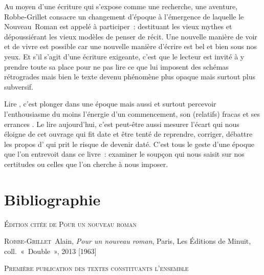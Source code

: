 \documentclass[12pt, a4paper]{article}
\begin{document}
Au moyen d'une écriture qui s'expose comme une recherche, une aventure, Robbe-Grillet consacre un changement d'époque à l'émergence de laquelle le Nouveau~Roman est appelé à participer~: destituant les vieux mythes et dépoussiérant les vieux modèles de penser de récit. Une nouvelle manière de voir et de vivre est possible car une nouvelle manière d'écrire est bel et bien sous nos yeux. Et s'il s'agit d'une écriture exigeante, c'est que le lecteur est invité à y prendre toute sa place pour ne pas lire ce que lui imposent des schémas rétrogrades mais bien le texte devenu phénomène plus opaque mais surtout plus subversif.

Lire \punr, c'est plonger dans une époque mais aussi et surtout percevoir l'enthousiasme du moins l'énergie d'un commencement, son (relatifs) fracas et ses errances %
. Le lire aujourd'hui, c'est peut-être aussi mesurer l'écart qui nous éloigne de cet ouvrage qui fit date et être tenté de reprendre, corriger, débattre les propos d'\robbe{} qui prit le risque de devenir daté. C'est tous le geste d'une époque que l'on entrevoit dans ce livre~: examiner le soupçon qui nous saisit sur nos certitudes ou celles que l'on cherche à nous imposer.




\newpage
\section{Bibliographie}
	
		
		\vspace*{2cm}
		\setlength{\parindent}{0cm}
{\large\textsc{Édition citée de Pour un nouveau roman}}
		\vspace*{1cm}
		\setlength{\parindent}{25pt}
		
		
		

		
		\textsc{Robbe-Grillet}~Alain, \textit{Pour un nouveau roman}, Paris, Les Éditions de Minuit, coll.~«~Double~», 2013 [1963]\par 
	
		\vspace*{2cm}
		\setlength{\parindent}{0cm}
{\large\textsc{Première publication des textes constituants l'ensemble}}
		\vspace*{1cm}
		\setlength{\parindent}{25pt}
		
		
		
\end{document}
